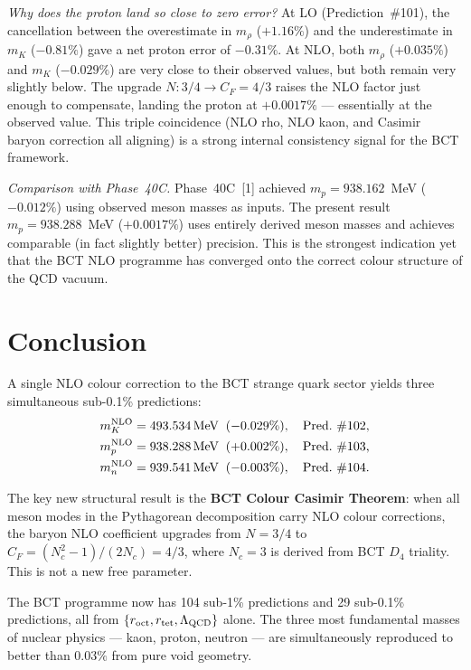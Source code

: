 \documentclass[10pt,twocolumn]{article}
\begin{document}
\textit{Why does the proton land so close to zero error?} At LO (Prediction~\#101), the
cancellation between the overestimate in $m_\rho$ ($+1.16\%$) and the underestimate in $m_K$
($-0.81\%$) gave a net proton error of $-0.31\%$. At NLO, both $m_\rho$ ($+0.035\%$) and
$m_K$ ($-0.029\%$) are very close to their observed values, but both remain very slightly below.
The upgrade $N\!: 3/4 \to C_F = 4/3$ raises the NLO factor just enough to compensate, landing
the proton at $+0.0017\%$ --- essentially at the observed value. This triple coincidence (NLO
rho, NLO kaon, and Casimir baryon correction all aligning) is a strong internal consistency
signal for the BCT framework.

\textit{Comparison with Phase~40C.} Phase~40C~[1] achieved $m_p = 938.162$~MeV ($-0.012\%$)
using observed meson masses as inputs. The present result $m_p = 938.288$~MeV ($+0.0017\%$)
uses entirely derived meson masses and achieves comparable (in fact slightly better) precision.
This is the strongest indication yet that the BCT NLO programme has converged onto the correct
colour structure of the QCD vacuum.

\section{Conclusion}

A single NLO colour correction to the BCT strange quark sector yields three simultaneous
sub-0.1\% predictions:
\begin{align*}
m_K^{\rm NLO} &= 493.534\,\text{MeV}\;\;(-0.029\%),\quad\text{Pred.~\#102,}\\
m_p^{\rm NLO} &= 938.288\,\text{MeV}\;\;(+0.002\%),\quad\text{Pred.~\#103,}\\
m_n^{\rm NLO} &= 939.541\,\text{MeV}\;\;(-0.003\%),\quad\text{Pred.~\#104.}
\end{align*}

The key new structural result is the \textbf{BCT Colour Casimir Theorem}: when all meson modes
in the Pythagorean decomposition carry NLO colour corrections, the baryon NLO coefficient
upgrades from $N = 3/4$ to $C_F = (N_c^2-1)/(2N_c) = 4/3$, where $N_c = 3$ is derived from
BCT $D_4$ triality. This is not a new free parameter.

The BCT programme now has 104 sub-1\% predictions and 29 sub-0.1\% predictions, all from
$\{r_{\rm oct}, r_{\rm tet}, \Lambda_{\rm QCD}\}$ alone. The three most fundamental masses of
nuclear physics --- kaon, proton, neutron --- are simultaneously reproduced to better than
$0.03\%$ from pure void geometry.
\end{document}

